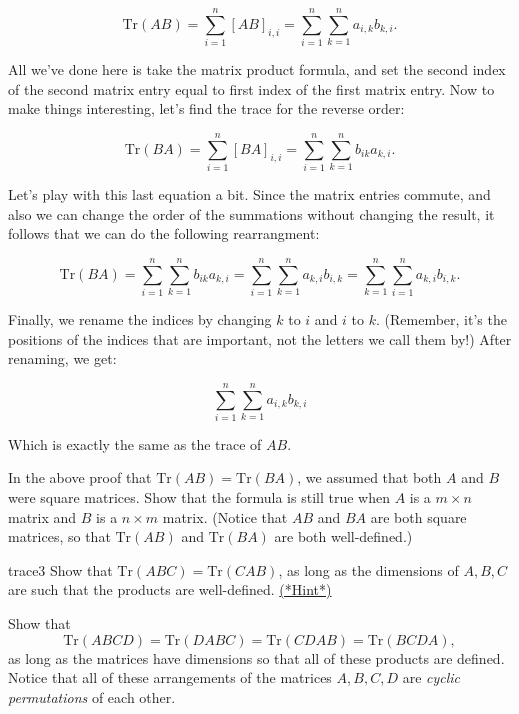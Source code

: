 \[ \text{Tr} \left({A} {B}\right) = \sum_{i=1}^n [AB]_{i,i} = \sum_{i=1}^n \sum_{k=1}^n a_{i,k}b_{k,i}. \]

All we've done here is take the matrix product formula, and set the second index of the second  matrix entry equal to first index of the first matrix entry.  Now to make things interesting, let's find the trace for the reverse order:

\[ \text{Tr} \left({B} {A}\right) = \sum_{i=1}^n [BA]_{i,i} = \sum_{i=1}^n \sum_{k=1}^n b_{ik}a_{k,i}. \]

Let's play with this last equation a bit. Since the matrix entries commute, and also  we can change the order of the summations without changing the result, it follows that we can do the following rearrangment:

\[ \text{Tr} \left({B} {A}\right) =\sum_{i=1}^n \sum_{k=1}^n b_{ik}a_{k,i} = \sum_{i=1}^n \sum_{k=1}^n a_{k,i}b_{i,k} = \sum_{k=1}^n \sum_{i=1}^n a_{k,i}b_{i,k}. \]

Finally, we rename the indices by changing $k$ to $i$ and $i$ to $k$.  (Remember, it's the positions of the indices that are important, not the letters we call them by!)  After renaming, we get:

\[ \sum_{i=1}^n \sum_{k=1}^n a_{i,k}b_{k,i} \]

Which is exactly the same as the trace of ${A}{B}$.

\begin {exercise}{}
In the above proof that $\text{Tr} ({AB}) = \text{Tr}({BA})$, we assumed that both $A$ and $B$ were square matrices. Show that the formula is still true when $A$ is a $m \times n$ matrix and $B$ is a $n \times m$ matrix.  (Notice that $AB$ and $BA$ are both square matrices, so that $\text{Tr} \left({A} {B}\right)$ and $\text{Tr} \left({B} {A}\right)$ are both well-defined.)
\end{exercise}

\begin {exercise}{trace3}
Show that $\text{Tr} ({ABC}) = \text{Tr}({CAB})$, as long as the dimensions of $A, B, C$ are such that the products are well-defined.
\hyperref[sec:sigma:hints]{(*Hint*)} 
\end{exercise}


\begin {exercise}{}
Show that 
\[ \text{Tr} ({ABCD}) = \text{Tr}({DABC})= \text{Tr}({CDAB}) = \text{Tr}({BCDA}),\] 
as long as the matrices have dimensions so that all of these products are defined.  Notice that all of these arrangements of the matrices $A, B, C, D$ are \emph{cyclic permutations} of each other.
\end{exercise}

